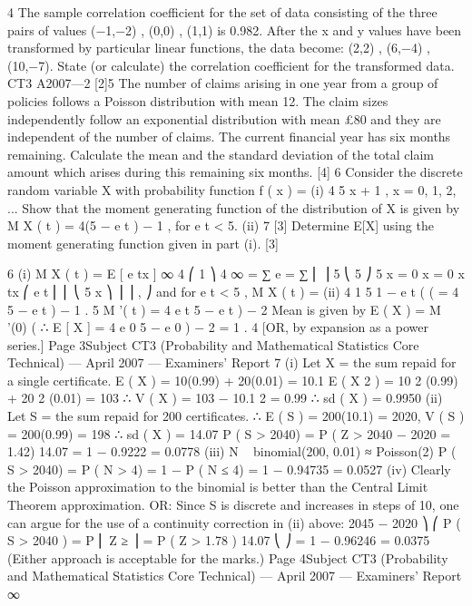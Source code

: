 4
The sample correlation coefficient for the set of data consisting of the three pairs of
values
(−1,−2) , (0,0) , (1,1)
is 0.982. After the x and y values have been transformed by particular linear functions,
the data become:
(2,2) , (6,−4) , (10,−7).
State (or calculate) the correlation coefficient for the transformed data.
CT3 A2007—2
[2]5
The number of claims arising in one year from a group of policies follows a Poisson
distribution with mean 12. The claim sizes independently follow an exponential
distribution with mean £80 and they are independent of the number of claims.
The current financial year has six months remaining.
Calculate the mean and the standard deviation of the total claim amount which arises
during this remaining six months.
[4]
6
Consider the discrete random variable X with probability function
f ( x ) =
(i)
4
5 x + 1
,
x = 0, 1, 2, ...
Show that the moment generating function of the distribution of X is given by
M X ( t ) = 4(5 − e t ) − 1 ,
for e t < 5.
(ii)
7
[3]
Determine E[X] using the moment generating function given in part (i).
[3]


6
(i)
M X ( t ) = E [ e tx ]
∞
4 ⎛ 1 ⎞
4 ∞
= ∑ e
=
∑
⎜ ⎟
5 ⎝ 5 ⎠
5 x = 0
x = 0
x
tx
⎛ e t
⎜ ⎜
⎝ 5
x
⎞
⎟ ⎟ ,
⎠
and for e t < 5 ,
M X ( t ) =
(ii)
4 1
5 1 − e t
(
(
= 4 5 − e t
)
− 1
.
5
M '( t ) = 4 e t 5 − e t
)
− 2
Mean is given by E ( X ) = M '(0)
(
∴ E [ X ] = 4 e 0 5 − e 0
)
− 2
=
1
.
4
[OR, by expansion as a power series.]
Page 3Subject CT3 (Probability and Mathematical Statistics Core Technical) — April 2007 — Examiners’ Report
7
(i)
Let X = the sum repaid for a single certificate.
E ( X ) = 10(0.99) + 20(0.01) = 10.1
E ( X 2 ) = 10 2 (0.99) + 20 2 (0.01) = 103
∴ V ( X ) = 103 − 10.1 2 = 0.99 ∴ sd ( X ) = 0.9950
(ii)
Let S = the sum repaid for 200 certificates.
∴ E ( S ) = 200(10.1) = 2020, V ( S ) = 200(0.99) = 198 ∴ sd ( X ) = 14.07
P ( S > 2040) = P ( Z >
2040 − 2020
= 1.42)
14.07
= 1 − 0.9222 = 0.0778
(iii)
N ~ binomial(200, 0.01) ≈ Poisson(2)
P ( S > 2040) = P ( N > 4)
= 1 − P ( N ≤ 4) = 1 − 0.94735 = 0.0527
(iv)
Clearly the Poisson approximation to the binomial is better than the Central
Limit Theorem approximation.
OR:
Since S is discrete and increases in steps of 10, one can argue for the use of a
continuity correction in (ii) above:
2045 − 2020 ⎞
⎛
P ( S > 2040 ) = P ⎜ Z ≥
⎟ = P ( Z > 1.78 )
14.07
⎝
⎠
= 1 − 0.96246 = 0.0375
(Either approach is acceptable for the marks.)
Page 4Subject CT3 (Probability and Mathematical Statistics Core Technical) — April 2007 — Examiners’ Report
∞
